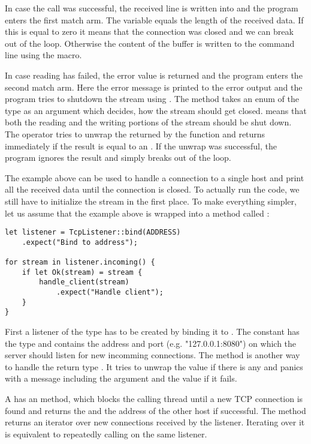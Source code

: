 In case the call was successful, the received line is written into  and the program enters the first match
arm. The variable  equals the length of the received data. If this is equal to zero it means that the
connection was closed and we can break out of the loop. Otherwise the content of the buffer is written to the command
line using the  macro.

In case reading has failed, the error value is returned and the program enters the second match arm. Here the error
message is printed to the error output and the program tries to shutdown the stream using
. The method takes an enum of the type  as an argument which
decides, how the stream should get closed.  means that both the reading and the writing portions of the
stream should be shut down. The  operator tries to unwrap the  returned by the function and
returns immediately if the result is equal to an . If the unwrap was successful, the program ignores the
result and simply breaks out of the loop.

The example above can be used to handle a connection to a single host and print all the received data until the
connection is closed. To actually run the code, we still have to initialize the stream in the first place. To make
everything simpler, let us assume that the example above is wrapped into a method called
:

\begin{verbatim}
let listener = TcpListener::bind(ADDRESS)
    .expect("Bind to address");

for stream in listener.incoming() {
    if let Ok(stream) = stream {
        handle_client(stream)
            .expect("Handle client");
    }
}
\end{verbatim}

First a listener of the type  has to be created by binding it to . The
constant  has the type  and contains the address and port (e.g. "127.0.0.1:8080") on which the
server should listen for new incomming connections. The method  is another way to handle the return type
. It tries to unwrap the  value if there is any and panics with a message including the argument
and the  value if it fails.

A  has an  method, which blocks the calling thread until a new TCP connection is found
and returns the  and the address of the other host if successful. The method  returns an
iterator over new connections received by the listener. Iterating over it is equivalent to repeatedly calling
 on the same listener.


